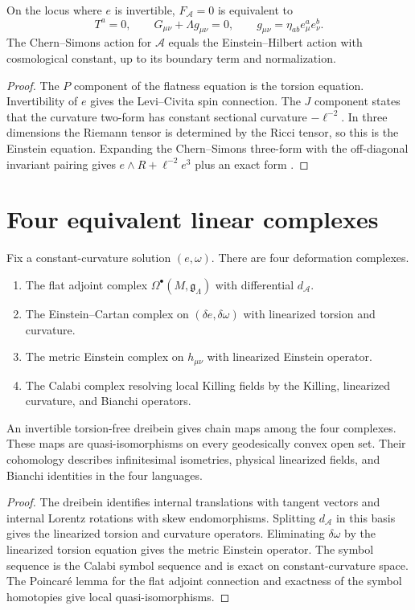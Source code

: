 \begin{theorem}
On the locus where $e$ is invertible, $F_{\mathcal A}=0$ is equivalent to
\[
 T^a=0,
 \qquad
 G_{\mu\nu}+\Lambda g_{\mu\nu}=0,
 \qquad
 g_{\mu\nu}=\eta_{ab}e^a_\mu e^b_\nu.
\]
The Chern--Simons action for $\mathcal A$ equals the Einstein--Hilbert action with cosmological constant, up to its boundary term and normalization.
\end{theorem}
\begin{proof}
The $P$ component of the flatness equation is the torsion equation.  Invertibility of $e$ gives the Levi--Civita spin connection.  The $J$ component states that the curvature two-form has constant sectional curvature $-\ell^{-2}$.  In three dimensions the Riemann tensor is determined by the Ricci tensor, so this is the Einstein equation.  Expanding the Chern--Simons three-form with the off-diagonal invariant pairing gives $e\wedge R+\ell^{-2}e^3$ plus an exact form 
\cite{AchucarroTownsend,Witten3DGravity}.
\end{proof}

\chapter{Four equivalent linear complexes}
Fix a constant-curvature solution $(e,\omega)$.  There are four deformation complexes.
\begin{enumerate}
\item The flat adjoint complex $\Omega^\bullet(M,\mathfrak g_\Lambda)$ with differential $d_{\mathcal A}$.
\item The Einstein--Cartan complex on $(\delta e,\delta\omega)$ with linearized torsion and curvature.
\item The metric Einstein complex on $h_{\mu\nu}$ with linearized Einstein operator.
\item The Calabi complex resolving local Killing fields by the Killing, linearized curvature, and Bianchi operators.
\end{enumerate}

\begin{theorem}
An invertible torsion-free dreibein gives chain maps among the four complexes.  These maps are quasi-isomorphisms on every geodesically convex open set.  Their cohomology describes infinitesimal isometries, physical linearized fields, and Bianchi identities in the four languages.
\end{theorem}
\begin{proof}
The dreibein identifies internal translations with tangent vectors and internal Lorentz rotations with skew endomorphisms.  Splitting $d_{\mathcal A}$ in this basis gives the linearized torsion and curvature operators.  Eliminating $\delta\omega$ by the linearized torsion equation gives the metric Einstein operator.  The symbol sequence is the Calabi symbol sequence and is exact on constant-curvature space.  The Poincar\'e lemma for the flat adjoint connection and exactness of the symbol homotopies give local quasi-isomorphisms.
\end{proof}

